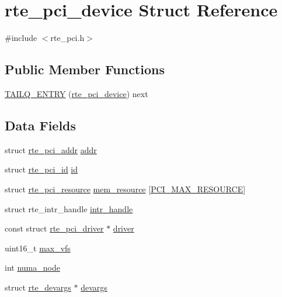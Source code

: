 \hypertarget{structrte__pci__device}{}\section{rte\+\_\+pci\+\_\+device Struct Reference}
\label{structrte__pci__device}


{\ttfamily \#include $<$rte\+\_\+pci.\+h$>$}

\subsection*{Public Member Functions}
\begin{DoxyCompactItemize}
\item 
\hyperlink{structrte__pci__device_a280d0e7f4b6eb553363b97cdbf52c451}{T\+A\+I\+L\+Q\+\_\+\+E\+N\+T\+R\+Y} (\hyperlink{structrte__pci__device}{rte\+\_\+pci\+\_\+device}) next
\end{DoxyCompactItemize}
\subsection*{Data Fields}
\begin{DoxyCompactItemize}
\item 
struct \hyperlink{structrte__pci__addr}{rte\+\_\+pci\+\_\+addr} \hyperlink{structrte__pci__device_ac06e27d1cf6546e487214cc7a4cbd523}{addr}
\item 
struct \hyperlink{structrte__pci__id}{rte\+\_\+pci\+\_\+id} \hyperlink{structrte__pci__device_ac7befc4a21c72cd25fbf280ccbc0c74a}{id}
\item 
struct \hyperlink{structrte__pci__resource}{rte\+\_\+pci\+\_\+resource} \hyperlink{structrte__pci__device_ae2869fca37eeec1d4c9054a857563394}{mem\+\_\+resource} \mbox{[}\hyperlink{rte__pci_8h_a8a86d34e4f13c7aa7883dc9379b1eeb3}{P\+C\+I\+\_\+\+M\+A\+X\+\_\+\+R\+E\+S\+O\+U\+R\+C\+E}\mbox{]}
\item 
struct rte\+\_\+intr\+\_\+handle \hyperlink{structrte__pci__device_a84420c24119bbab092b9bb715278c0a2}{intr\+\_\+handle}
\item 
const struct \hyperlink{structrte__pci__driver}{rte\+\_\+pci\+\_\+driver} $\ast$ \hyperlink{structrte__pci__device_a97c6c643faa744455604a9d0bd40ae4d}{driver}
\item 
uint16\+\_\+t \hyperlink{structrte__pci__device_a9e1ee240ce273f933ba2639bd751509b}{max\+\_\+vfs}
\item 
int \hyperlink{structrte__pci__device_ad090419c0eee32bef787f0b111ee679c}{numa\+\_\+node}
\item 
struct \hyperlink{structrte__devargs}{rte\+\_\+devargs} $\ast$ \hyperlink{structrte__pci__device_abf98358c8fdfd7de9fe96db6fdc4bd84}{devargs}
\end{DoxyCompactItemize}


